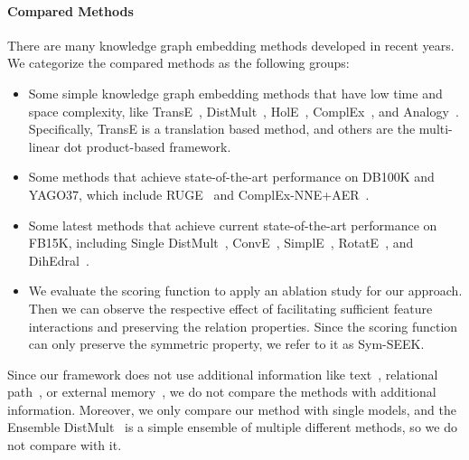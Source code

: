 \documentclass[11pt,a4paper]{article}
\begin{document}
\paragraph*{Compared Methods}
There are many knowledge graph embedding methods developed in recent years. We categorize the compared methods as the following groups:
\begin{itemize}[label={-},leftmargin=1.5em]
	\item Some simple knowledge graph embedding methods that have low time and space complexity, like TransE~\cite{bordes2013translating}, DistMult~\cite{yang2015embedding}, HolE~\cite{nickel2016holographic}, ComplEx~\cite{trouillon2016complex}, and Analogy~\cite{liu2017analogical}. Specifically, TransE is a translation based method, and others are the multi-linear dot product-based framework.
	
	\item Some methods that achieve state-of-the-art performance on DB100K and YAGO37, which include RUGE~\cite{guo2018:RUGE} and ComplEx-NNE+AER~\cite{boyang2018:aer}.
	
	\item Some latest methods that achieve current state-of-the-art performance on FB15K, including Single DistMult~\cite{kadlec2017knowledge}, ConvE~\cite{dettmers2018conve}, SimplE~\cite{kazemi2018simple}, RotatE~\cite{sun2018rotate}, and DihEdral~\cite{DBLP:conf/acl/XuL19}. 
	
	\item We evaluate the scoring function  to apply an ablation study for our approach. Then we can observe the respective effect of facilitating sufficient feature interactions and preserving the relation properties. Since the scoring function  can only preserve the symmetric property, we refer to it as Sym-SEEK.
\end{itemize}
Since our framework does not use additional information like text~\cite{toutanova2015observed}, relational path~\cite{ebisu2019graph}, or external memory~\cite{shen2017modeling}, we do not compare the methods with additional information. Moreover, we only compare our method with single models, and the Ensemble DistMult~\cite{kadlec2017knowledge} is a simple ensemble of multiple different methods, so we do not compare with it.
\end{document}
